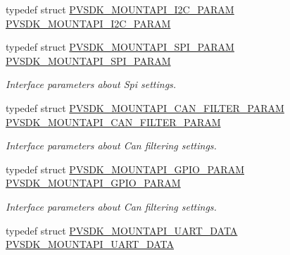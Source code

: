 \begin{DoxyCompactItemize}
typedef struct \hyperlink{struct_p_v_s_d_k___m_o_u_n_t_a_p_i___i2_c___p_a_r_a_m}{P\+V\+S\+D\+K\+\_\+\+M\+O\+U\+N\+T\+A\+P\+I\+\_\+\+I2\+C\+\_\+\+P\+A\+R\+AM} \hyperlink{group___p_v_s_d_k___c_o_r_e___a_p_i___m_o_u_n_t_c_o_n_t_r_o_l_ga4e270fbcc48157c9c155f421dc0f47a7}{P\+V\+S\+D\+K\+\_\+\+M\+O\+U\+N\+T\+A\+P\+I\+\_\+\+I2\+C\+\_\+\+P\+A\+R\+AM}
\item 
typedef struct \hyperlink{struct_p_v_s_d_k___m_o_u_n_t_a_p_i___s_p_i___p_a_r_a_m}{P\+V\+S\+D\+K\+\_\+\+M\+O\+U\+N\+T\+A\+P\+I\+\_\+\+S\+P\+I\+\_\+\+P\+A\+R\+AM} \hyperlink{group___p_v_s_d_k___c_o_r_e___a_p_i___m_o_u_n_t_c_o_n_t_r_o_l_gab4d8aa3aa340f71ca2aa5db0d0b9f6ea}{P\+V\+S\+D\+K\+\_\+\+M\+O\+U\+N\+T\+A\+P\+I\+\_\+\+S\+P\+I\+\_\+\+P\+A\+R\+AM}
\begin{DoxyCompactList}\small\item\em Interface parameters about Spi settings. \end{DoxyCompactList}\item 
typedef struct \hyperlink{struct_p_v_s_d_k___m_o_u_n_t_a_p_i___c_a_n___f_i_l_t_e_r___p_a_r_a_m}{P\+V\+S\+D\+K\+\_\+\+M\+O\+U\+N\+T\+A\+P\+I\+\_\+\+C\+A\+N\+\_\+\+F\+I\+L\+T\+E\+R\+\_\+\+P\+A\+R\+AM} \hyperlink{group___p_v_s_d_k___c_o_r_e___a_p_i___m_o_u_n_t_c_o_n_t_r_o_l_ga64eca0571868dd8d6cc7e468cd960745}{P\+V\+S\+D\+K\+\_\+\+M\+O\+U\+N\+T\+A\+P\+I\+\_\+\+C\+A\+N\+\_\+\+F\+I\+L\+T\+E\+R\+\_\+\+P\+A\+R\+AM}
\begin{DoxyCompactList}\small\item\em Interface parameters about Can filtering settings. \end{DoxyCompactList}\item 
typedef struct \hyperlink{struct_p_v_s_d_k___m_o_u_n_t_a_p_i___g_p_i_o___p_a_r_a_m}{P\+V\+S\+D\+K\+\_\+\+M\+O\+U\+N\+T\+A\+P\+I\+\_\+\+G\+P\+I\+O\+\_\+\+P\+A\+R\+AM} \hyperlink{group___p_v_s_d_k___c_o_r_e___a_p_i___m_o_u_n_t_c_o_n_t_r_o_l_ga4fd152426e75832be2f4547276dceaf3}{P\+V\+S\+D\+K\+\_\+\+M\+O\+U\+N\+T\+A\+P\+I\+\_\+\+G\+P\+I\+O\+\_\+\+P\+A\+R\+AM}
\begin{DoxyCompactList}\small\item\em Interface parameters about Can filtering settings. \end{DoxyCompactList}\item 
typedef struct \hyperlink{struct_p_v_s_d_k___m_o_u_n_t_a_p_i___u_a_r_t___d_a_t_a}{P\+V\+S\+D\+K\+\_\+\+M\+O\+U\+N\+T\+A\+P\+I\+\_\+\+U\+A\+R\+T\+\_\+\+D\+A\+TA} \hyperlink{group___p_v_s_d_k___c_o_r_e___a_p_i___m_o_u_n_t_c_o_n_t_r_o_l_ga7826a0e8e174f4296072e82dd219203f}{P\+V\+S\+D\+K\+\_\+\+M\+O\+U\+N\+T\+A\+P\+I\+\_\+\+U\+A\+R\+T\+\_\+\+D\+A\+TA}

\end{DoxyCompactItemize}
